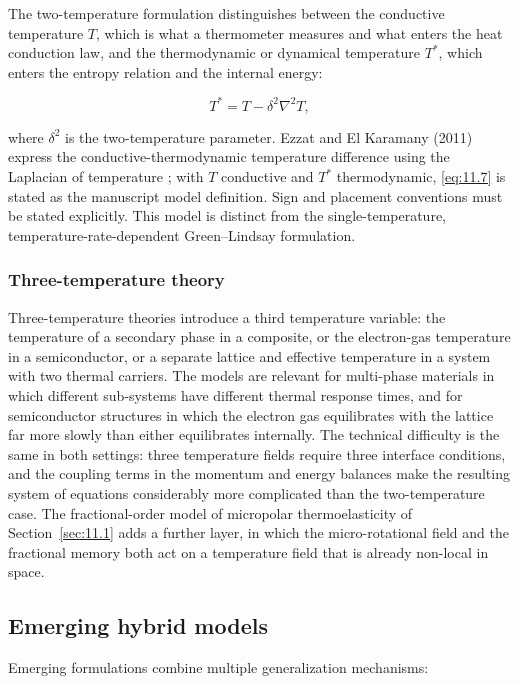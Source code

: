 The two-temperature formulation distinguishes between the conductive temperature $T$, which is what a thermometer measures and what enters the heat conduction law, and the thermodynamic or dynamical temperature $T^*$, which enters the entropy relation and the internal energy:

\begin{equation}
T^* = T - \delta^2 \nabla^2 T,
\label{eq:11.7}
\end{equation}

where $\delta^2$ is the two-temperature parameter. Ezzat and El Karamany (2011) express the conductive-thermodynamic temperature difference using the Laplacian of temperature \cite{Ezzat2011}; with $T$ conductive and $T^*$ thermodynamic, \eqref{eq:11.7} is stated as the manuscript model definition. Sign and placement conventions must be stated explicitly. This model is distinct from the single-temperature, temperature-rate-dependent Green--Lindsay formulation.

\subsubsection{Three-temperature theory}

Three-temperature theories introduce a third temperature variable: the temperature of a secondary phase in a composite, or the electron-gas temperature in a semiconductor, or a separate lattice and effective temperature in a system with two thermal carriers. The models are relevant for multi-phase materials in which different sub-systems have different thermal response times, and for semiconductor structures in which the electron gas equilibrates with the lattice far more slowly than either equilibrates internally. The technical difficulty is the same in both settings: three temperature fields require three interface conditions, and the coupling terms in the momentum and energy balances make the resulting system of equations considerably more complicated than the two-temperature case. The fractional-order model of micropolar thermoelasticity of Section~\ref{sec:11.1} adds a further layer, in which the micro-rotational field and the fractional memory both act on a temperature field that is already non-local in space.

\subsection{Emerging hybrid models}
\label{sec:11.4}

Emerging formulations combine multiple generalization mechanisms:

